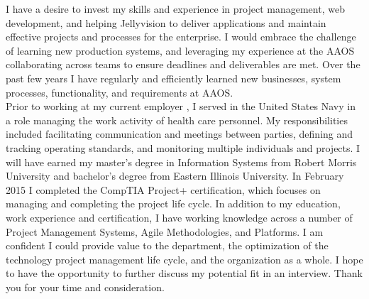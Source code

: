 \documentclass[9pt, a4paper]{awesome-cv}
\begin{document}
\begin{cvletter}
I have a desire to invest my skills and experience in project management, web development, and helping Jellyvision to deliver applications and maintain effective projects and processes for the enterprise. I would embrace the challenge of learning new production systems, and leveraging my experience at the AAOS collaborating across teams to ensure deadlines and deliverables are met. Over the past few years I have regularly and efficiently learned new businesses, system processes, functionality, and requirements at AAOS.\\

Prior to working at my current employer , I served in the  United States Navy in a role managing the work activity of health care personnel. My responsibilities included facilitating communication and meetings between parties, defining and tracking operating standards, and monitoring multiple individuals and projects. I will have earned my master’s degree in Information Systems from Robert Morris University and bachelor’s degree from Eastern Illinois University. In February 2015 I completed the CompTIA Project+ certification, which focuses on managing and completing the project life cycle. In addition to my education, work experience and certification, I have working knowledge across a number of Project Management Systems, Agile Methodologies, and Platforms. I am confident I could provide value to the department, the optimization of the technology project management life cycle, and the organization as a whole. I hope to have the opportunity to further discuss my potential fit in an interview. Thank you for your time and consideration.

\end{cvletter}

\makeletterclosing
\end{document}
